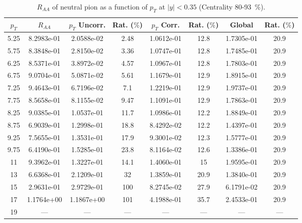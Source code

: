             
\begin{table}[!htb]
\centering
\begin{tabular}{|c|c|c|c|c|c|c|c|}
\hline
$p_{T}$ & $R_{AA}$ & $p_{T}$ Uncorr. & Rat. ($\%$) & $p_{T}$ Corr. & Rat. ($\%$) & Global & Rat. ($\%$)\\
\hline
5.25 & 8.2983e-01 & 2.0588e-02 & 2.48 & 1.0612e-01 & 12.8 & 1.7305e-01 & 20.9 \\ 
5.75 & 8.3848e-01 & 2.8150e-02 & 3.36 & 1.0747e-01 & 12.8 & 1.7485e-01 & 20.9 \\ 
6.25 & 8.5371e-01 & 3.8972e-02 & 4.57 & 1.0967e-01 & 12.8 & 1.7803e-01 & 20.9 \\ 
6.75 & 9.0704e-01 & 5.0871e-02 & 5.61 & 1.1679e-01 & 12.9 & 1.8915e-01 & 20.9 \\ 
7.25 & 9.4643e-01 & 6.7196e-02 & 7.1 & 1.2219e-01 & 12.9 & 1.9737e-01 & 20.9 \\ 
7.75 & 8.5658e-01 & 8.1155e-02 & 9.47 & 1.1091e-01 & 12.9 & 1.7863e-01 & 20.9 \\ 
8.25 & 9.0385e-01 & 1.0537e-01 & 11.7 & 1.0986e-01 & 12.2 & 1.8849e-01 & 20.9 \\ 
8.75 & 6.9039e-01 & 1.2998e-01 & 18.8 & 8.4292e-02 & 12.2 & 1.4397e-01 & 20.9 \\ 
9.25 & 7.5655e-01 & 1.3531e-01 & 17.9 & 9.3001e-02 & 12.3 & 1.5777e-01 & 20.9 \\ 
9.75 & 6.4190e-01 & 1.5285e-01 & 23.8 & 8.1164e-02 & 12.6 & 1.3386e-01 & 20.9 \\ 
11 & 9.3962e-01 & 1.3227e-01 & 14.1 & 1.4060e-01 & 15 & 1.9595e-01 & 20.9 \\ 
13 & 6.6368e-01 & 2.1209e-01 & 32 & 1.3859e-01 & 20.9 & 1.3840e-01 & 20.9 \\ 
15 & 2.9631e-01 & 2.9729e-01 & 100 & 8.2745e-02 & 27.9 & 6.1791e-02 & 20.9 \\ 
17 & 1.1764e+00 & 1.1867e+00 & 101 & 4.1988e-01 & 35.7 & 2.4533e-01 & 20.9 \\ 
19 & --- & --- & --- & --- & --- & --- & --- \\ 
\hline
\end{tabular}
\caption{$R_{AA}$ of neutral pion as a function of $p_{T}$ at $|y|<0.35$ (Centrality 80-93~$\%$).}
\end{table}
            
